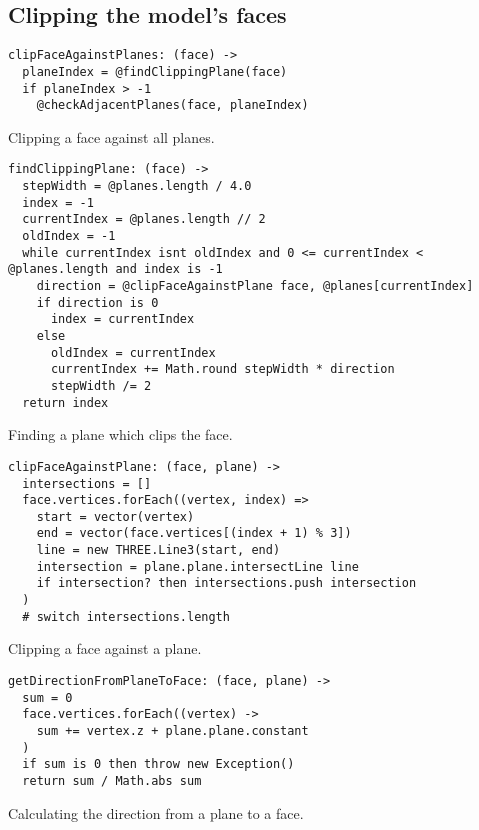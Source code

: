 \documentclass[../ClassicThesis.tex]{subfiles}
\begin{document}
\subsection{Clipping the model's faces}

\begin{listing}[ht]
\begin{verbatim}
clipFaceAgainstPlanes: (face) ->
  planeIndex = @findClippingPlane(face)
  if planeIndex > -1
    @checkAdjacentPlanes(face, planeIndex)
\end{verbatim}
\caption{Clipping a face against all planes.}
\label{lst:clipfaceplanes}
\end{listing}

\begin{listing}[ht]
\begin{verbatim}
findClippingPlane: (face) ->
  stepWidth = @planes.length / 4.0
  index = -1
  currentIndex = @planes.length // 2
  oldIndex = -1
  while currentIndex isnt oldIndex and 0 <= currentIndex < @planes.length and index is -1
    direction = @clipFaceAgainstPlane face, @planes[currentIndex]
    if direction is 0
      index = currentIndex
    else
      oldIndex = currentIndex
      currentIndex += Math.round stepWidth * direction
      stepWidth /= 2
  return index
\end{verbatim}
\caption{Finding a plane which clips the face.}
\label{lst:findplane}
\end{listing}

\begin{listing}[ht]
\begin{verbatim}
clipFaceAgainstPlane: (face, plane) ->
  intersections = []
  face.vertices.forEach((vertex, index) =>
    start = vector(vertex)
    end = vector(face.vertices[(index + 1) % 3])
    line = new THREE.Line3(start, end)
    intersection = plane.plane.intersectLine line
    if intersection? then intersections.push intersection
  )
  # switch intersections.length
\end{verbatim}
\caption{Clipping a face against a plane.}
\label{lst:clipfaceplane}
\end{listing}

\begin{listing}[ht]
\begin{verbatim}
getDirectionFromPlaneToFace: (face, plane) ->
  sum = 0
  face.vertices.forEach((vertex) ->
    sum += vertex.z + plane.plane.constant
  )
  if sum is 0 then throw new Exception()
  return sum / Math.abs sum
\end{verbatim}
\caption{Calculating the direction from a plane to a face.}
\label{lst:facedirection}
\end{listing}
\end{document}
